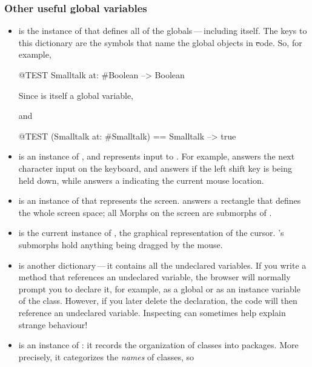 \documentclass[a4paper,10pt,twoside]{book}
\begin{document}

\subsubsection{Other useful global variables}

\begin{itemize}
\item
{} is the instance of  that defines all of the globals\,---\,including  itself.   
The keys to this dictionary are the symbols that name the global objects in \st code.
So, for example,
\begin{code}{@TEST}
Smalltalk at: #Boolean --> Boolean
\end{code}
Since  is itself a global variable,
\begin{code}{}
Smalltalk at: #Smalltalk-->a SystemDictionary(lots of globals)}
\end{code} 
and
\begin{code}{@TEST}
(Smalltalk at: #Smalltalk) == Smalltalk --> true
\end{code}

\item {} is an instance of , and represents input to \pharo.
For example,  answers the next character input on the keyboard, and  answers  if the left shift key is being held down, while  answers a  indicating the current mouse location.

\item {} is an instance of  that represents the screen.
 answers a rectangle that defines the whole screen space; all Morphs on the screen are submorphs of .

\item 
{} is the current instance of , the graphical representation of the cursor.  's submorphs hold anything being dragged by the mouse.

\item
{} is another dictionary\,---\,it contains all the undeclared variables.
If you write a method that references an undeclared variable, the browser will normally
prompt you to declare it, for example, as a global or as an instance variable of the class.
However, if you later delete the declaration, the code will then reference an undeclared variable.
Inspecting  can sometimes help explain strange behaviour!

\item
{} is an instance of : it records the organization of classes into packages.  More precisely, it categorizes the \emph{names} of classes, so
\end{itemize}
\end{document}
